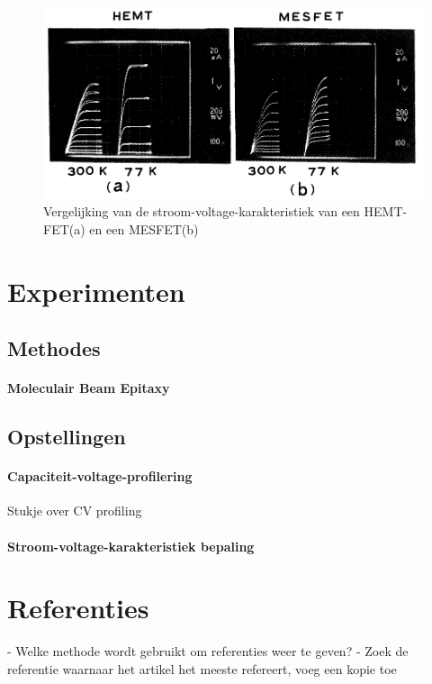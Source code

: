 \documentclass[11pt]{article}
\begin{document}
\begin{figure}[h]
  \begin{center}
\includegraphics[width=\textwidth]{CV-characteristics.png}
\caption{Vergelijking van de stroom-voltage-karakteristiek van een HEMT-FET(a) en een MESFET(b)}
\label{fig:cv_karakteristieken}
  \end{center}
\end{figure}

\clearpage

\section{Experimenten}
\subsection{Methodes}
\paragraph{Moleculair Beam Epitaxy}

\subsection{Opstellingen}
\paragraph{Capaciteit-voltage-profilering}
Stukje over CV profiling

\paragraph{Stroom-voltage-karakteristiek bepaling}

\section{Referenties}
  - Welke methode wordt gebruikt om referenties weer te geven?
  - Zoek de referentie waarnaar het artikel het meeste refereert, voeg een kopie toe

%
%

\appendix
\end{document}
